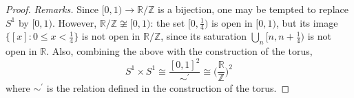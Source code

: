 \begin{proof}
		\textit{Remarks.} Since $[0, 1) \rightarrow \mathbb{R}/\mathbb{Z}$ is a bijection, one may be tempted to replace $S^1$ by $[0, 1)$. However, $\mathbb{R} / \mathbb{Z} \not\cong [0, 1)$: the set $[0, \tfrac{1}{4})$ is open in $[0, 1)$, but its image $\{[x] \colon 0 \leq x < \tfrac{1}{4}\}$ is not open in $\mathbb{R}/\mathbb{Z}$, since its saturation $\bigcup_{n} [n, n + \tfrac{1}{4})$ is not open in $\mathbb{R}$. Also, combining the above with the construction of the torus, 
		\begin{equation}
			S^1 \times S^1 \cong \frac{[0,1]^2}{\sim^\prime} \cong \bigg( \frac{\mathbb{R}}{\mathbb{Z}} \bigg)^2
		\end{equation}
		where $\sim^\prime$ is the relation defined in the construction of the torus. 
	\end{proof}


